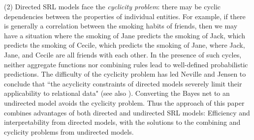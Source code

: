 \documentclass[letterpaper]{article}
\begin{document}
(2) Directed SRL models face the {\em cyclicity problem}: there may be cyclic dependencies between the properties of individual entities. For example, if there is generally a correlation between the smoking habits of friends, then we may have a situation where the smoking of Jane predicts the smoking of Jack, which predicts the smoking of Cecile, which predicts the smoking of Jane, where Jack, Jane, and Cecile are all friends with each other. In the presence of such cycles, neither aggregate functions nor combining rules lead to well-defined probabilistic predictions.
The difficulty of the cyclicity problem has led Neville and Jensen to conclude that ``the acyclicity constraints of directed models severely limit their applicability to relational data"  (see also \cite{Domingos2007,Taskar2002}). Converting the Bayes net to an undirected model avoids the cyclicity problem. Thus the approach of this paper combines advantages of both directed and undirected SRL models: Efficiency and interpretability from directed models, with the solutions to the combining and cyclicity problems from undirected models.
\end{document}
